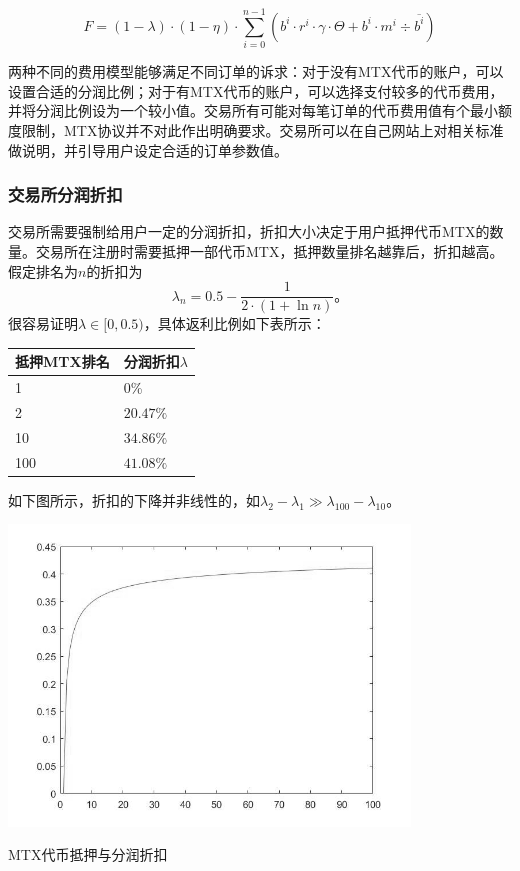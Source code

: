 \documentclass[UTF8,nofonts]{ctexart}
\makeatletter
\newenvironment{tablehere}
  {\def\@captype{table}}
  {}
\newenvironment{figurehere}
  {\def\@captype{figure}}
  {}
\makeatother
\begin{document}
\begin{equation*}
F =(1-\lambda)\cdot (1-\eta) \cdot  \sum^{n-1}_{i=0} (b^i \cdot r^i \cdot \gamma \cdot \Theta + b^i \cdot m^i  \div \overline{b^i})
\end{equation*}


两种不同的费用模型能够满足不同订单的诉求：对于没有MTX代币的账户，可以设置合适的分润比例；对于有MTX代币的账户，可以选择支付较多的代币费用，并将分润比例设为一个较小值。交易所有可能对每笔订单的代币费用值有个最小额度限制，MTX协议并不对此作出明确要求。交易所可以在自己网站上对相关标准做说明，并引导用户设定合适的订单参数值。

\subsubsection{交易所分润折扣}
交易所需要强制给用户一定的分润折扣，折扣大小决定于用户抵押代币MTX的数量。交易所在注册时需要抵押一部代币MTX，抵押数量排名越靠后，折扣越高。假定排名为$n$的折扣为
$$\lambda_{n} = 0.5 - \frac{1}{2\cdot (1+\ln n)}\text{。}$$
很容易证明$\lambda \in [0,0.5)$，具体返利比例如下表所示：
\begin{center}
\begin{tablehere}%
\centering
\begin{tabular}{p{3.5cm}|p{3cm}} %
\hline
抵押MTX排名 & 分润折扣$\lambda$ \\ %
\hline %
1 & 0\%\\
\hline
2 & $20.47\%$\\
\hline
10 & $34.86\%$\\
\hline
100 &$41.08\%$\\
\hline
\end{tabular}
\end{tablehere}
\end{center}


如下图所示，折扣的下降并非线性的，如$\lambda_{2} - \lambda_{1} \gg \lambda_{100} - \lambda_{10}$。

\begin{center}
\begin{figurehere}
\includegraphics[height=8cm]{images/exchange-discount.png}
\caption{MTX代币抵押与分润折扣}
\label{fig:mtxprotocol}
\end{figurehere}
\end{center}
\end{document}
